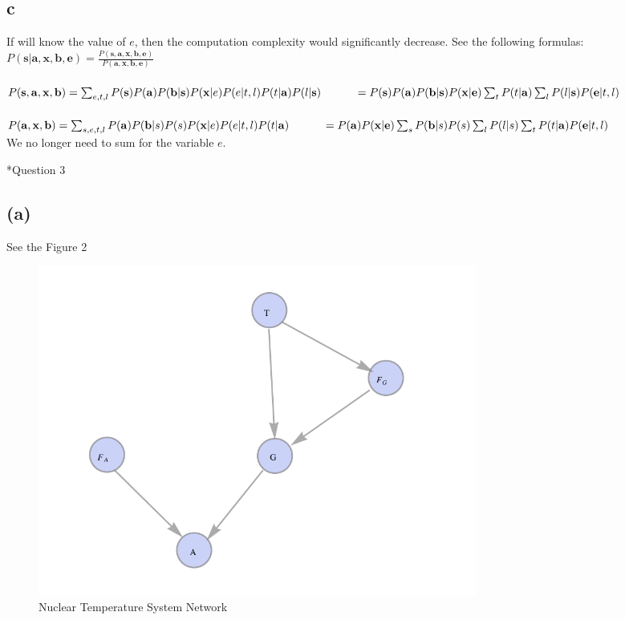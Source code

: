 \documentclass[12pt]{amsart}
\makeatletter
\renewcommand{\section}{\@startsection{section}{1}{0mm}
{-\baselineskip}{0.5\baselineskip}{\bf\leftline}}
\makeatother
\begin{document}
\subsection*{c}
If will know the value of $e$, then the computation complexity would significantly decrease. See the following formulas:\\
$P(\mathbf{s}|\mathbf{a},\mathbf{x,b,e})=\frac{P(\mathbf{s,a,x,b,e})}{P(\mathbf{a,x,b,e})}$\\
\\
$P(\mathbf{s,a,x,b})
=\sum_{e,t,l}P(\mathbf{s})P(\mathbf{a})P(\mathbf{b|s})P(\mathbf{x}|e)P(e|t,l)P(t|\mathbf{a})P(l|\mathbf{s})
\\ \indent \indent =P(\mathbf{s})P(\mathbf{a})P(\mathbf{b|s})P(\mathbf{x}|\mathbf{e})
\sum_{t}P(t|\mathbf{a})
\sum_{l}P(l|\mathbf{s})
P(\mathbf{e}|t,l)$\\
\\
$P(\mathbf{a,x,b})
=\sum_{s,e,t,l}P(\mathbf{a})P(\mathbf{b}|s)P(s)P(\mathbf{x}|e)P(e|t,l)P(t|\mathbf{a})
\\ \indent \indent =P(\mathbf{a})P(\mathbf{x|e})
\sum_{s}P(\mathbf{b}|s)P(s)
\sum_{l}P(l|s)
\sum_{t}P(t|\mathbf{a})
P(\mathbf{e}|t,l)
$\\
We no longer need to sum for the variable $e$.

\section*{Question 3}
\subsection*{(a)}
See the Figure 2
\begin{figure}[h]
  \centering
  \includegraphics[width=0.7\textwidth]{temp.pdf}
  \caption{Nuclear Temperature System Network}
\end{figure}
\end{document}
